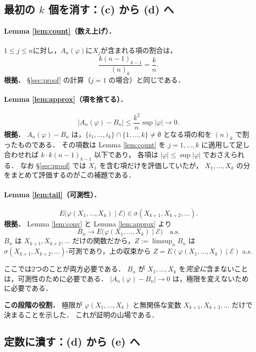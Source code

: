 \documentclass[a4paper,11pt,uplatex,dvipdfmx]{jsarticle}
\theoremstyle{plain}
\theoremstyle{definition}
\begin{document}
\subsection{最初の $k$ 個を消す：(c) から (d) へ}\label{subsec:directly-remove}

\paragraph{Lemma \ref{lem:count}（数え上げ）．}
$1\le j\le n$に対し，$A_n(\varphi)$に$X_j$が含まれる項の割合は，
\[
  \frac{k(n-1)_{k-1}}{(n)_k}=\frac{k}{n}.
\]
\textbf{根拠．}
\S\ref{sec:proof} の計算（$j=1$ の場合）と同じである．

\paragraph{Lemma \ref{lem:approx}（項を捨てる）．}
\[
  \bigl|A_n(\varphi)-B_n\bigr|\le\frac{k^2}{n}\sup|\varphi|\longrightarrow0 .
\]
\textbf{根拠．}
$A_n(\varphi)-B_n$ は，$\{i_1,\dots,i_k\}\cap\{1,\dots,k\}\ne\emptyset$ となる項の和を $(n)_k$ で割ったものである．
その項数は Lemma \ref{lem:count} を $j=1,\dots,k$ に適用して足し合わせれば $k\cdot k(n-1)_{k-1}$ 以下であり，
各項は $|\varphi|\le\sup|\varphi|$ でおさえられる．
なお \S\ref{sec:proof} では $X_1$ を含む項だけを評価していたが，
$X_1,\dots,X_k$ の分をまとめて評価するのがこの補題である．

\paragraph{Lemma \ref{lem:tail}（可測性）．}
\[
  E\bigl(\varphi(X_1,\dots,X_k)\mid\mathcal{E}\bigr)\in\sigma(X_{k+1},X_{k+2},\dots).
\]
\textbf{根拠．}
Lemma \ref{lem:conv} と Lemma \ref{lem:approx} より
\[
  B_n\longrightarrow E\bigl(\varphi(X_1,\dots,X_k)\mid\mathcal{E}\bigr)\quad\text{a.s.}
\]
$B_n$ は $X_{k+1},X_{k+2},\dots$ だけの関数だから，$Z:=\limsup_nB_n$ は
$\sigma(X_{k+1},X_{k+2},\dots)$-可測であり，上の収束から
$Z=E(\varphi(X_1,\dots,X_k)\mid\mathcal{E})$ a.s.

ここでは2つのことが両方必要である．
$B_n$ が $X_1,\dots,X_k$ を\emph{完全に}含まないことは，可測性のために必要である．
$|A_n(\varphi)-B_n|\to0$ は，極限を変えないために必要である．

\medskip\noindent\textbf{この段階の役割．}
極限が $\varphi(X_1,\dots,X_k)$ と無関係な変数 $X_{k+1},X_{k+2},\dots$ だけで決まることを示した．
これが証明の山場である．

\subsection{定数に潰す：(d) から (e) へ}\label{subsec:directly-collapse}
\end{document}
